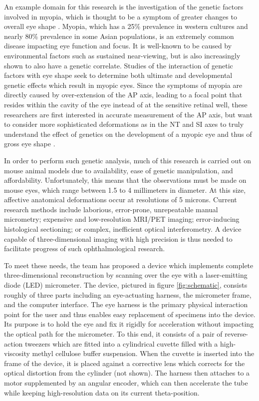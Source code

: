 \documentclass{article}
\begin{document}
An example domain for this research is the investigation of the
genetic factors involved in myopia, which is thought to be a symptom
of greater changes to overall eye shape \cite{atchison04}. Myopia,
which has a 25\% prevalence in western cultures and nearly 80\%
prevalence in some Asian populations\cite{rajan98}, is an extremely
common disease impacting eye function and focus. It is well-known to
be caused by environmental factors such as sustained near-viewing, but
is also increasingly shown to also have a genetic
correlate\cite{zhou99:genes,zhou99:models,schmucker04}. Studies of the
interaction of genetic factors with eye shape seek to determine both
ultimate and developmental genetic effects which result in myopic
eyes. Since the symptoms of myopia are directly caused by
over-extension of the AP axis, leading to a focal point that resides
within the cavity of the eye instead of at the sensitive retinal well,
these researchers are first interested in accurate measurement of the
AP axis\cite{wallman04}, but want to consider more sophisticated
deformations as in the NT and SI axes to truly understand the effect
of genetics on the development of a myopic eye\cite{schaeffel04} and
thus of gross eye shape \cite{atchison04}.
 
In order to perform such genetic analysis, much of this research is
carried out on mouse animal models due to availability, ease of
genetic manipulation, and
affordability\cite{schaeffel04}. Unfortunately, this means that the
observations must be made on mouse eyes, which range between 1.5 to 4
millimeters in diameter. At this size, affective anatomical
deformations occur at resolutions of 5 microns. Current research
methods include laborious, error-prone, unrepeatable manual
micrometry\cite{wallman04}; expensive and low-resolution MRI/PET
imaging\cite{atchison04}; error-inducing histological
sectioning\cite{schaeffel04}; or complex, inefficient optical
interferometry\cite{guggenheim04,schaeffel04}. A device capable of
three-dimensional imaging with high precision is thus needed to
facilitate progress of such ophthalmological research.
 
To meet these needs, the team has proposed a device which implements
complete three-dimensional reconstruction by scanning over the eye
with a laser-emitting diode (LED) micrometer. The device, pictured in
figure \ref{fig:schematic}, consists roughly of three parts including
an eye-actuating harness, the micrometer frame, and the computer
interface. The eye harness is the primary physical interaction point
for the user and thus enables easy replacement of specimens into the
device. Its purpose is to hold the eye and fix it rigidly for
acceleration without impacting the optical path for the micrometer. To
this end, it consists of a pair of reverse-action tweezers which are
fitted into a cylindrical cuvette filled with a high-viscosity methyl
cellulose buffer suspension. When the cuvette is inserted into the
frame of the device, it is placed against a corrective lens which
corrects for the optical distortion from the cylinder (not shown). The
harness then attaches to a motor supplemented by an angular encoder,
which can then accelerate the tube while keeping high-resolution data
on its current theta-position.
 
\end{document}

